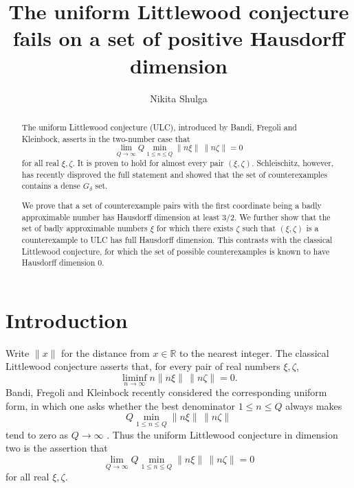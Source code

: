 \documentclass[11pt]{amsart}
\title[Uniform Littlewood counterexamples of positive dimension]{The uniform Littlewood conjecture fails on a set of positive Hausdorff dimension}
\author[Nikita Shulga]{Nikita Shulga}
\newcommand{\R}{\mathbb R}
\begin{document}
\begin{abstract}
The uniform Littlewood conjecture (ULC), introduced by Bandi,
Fregoli and Kleinbock, asserts in the two-number case that
$$
 \lim_{Q\to\infty} Q\min_{1\le n\le Q}\|n\xi\|\,\|n\zeta\|=0
$$
for all real $\xi,\zeta$.  It is proven to hold for almost every pair $(\xi,\zeta)$.
Schleischitz, however, has recently disproved the full statement and showed that the set of
counterexamples contains a dense $G_\delta$ set.

We prove that a set of counterexample pairs with the first coordinate being a badly approximable number has Hausdorff dimension at least $3/2$.  We further
show that the set of badly approximable numbers $\xi$ for which there exists
$\zeta$ such that $(\xi,\zeta)$ is a counterexample to ULC has full Hausdorff
dimension.  This contrasts with the classical Littlewood conjecture, for which
the set of possible counterexamples is known to have Hausdorff dimension $0$.
\end{abstract}

\maketitle



\bigskip

\section{Introduction}

Write $\|x\|$ for the distance from $x\in\R$ to the nearest integer.  The
classical Littlewood conjecture asserts that, for every pair of real numbers
$\xi,\zeta$,
$$
 \liminf_{n\to\infty} n\|n\xi\|\,\|n\zeta\|=0.
$$
Bandi, Fregoli and Kleinbock recently considered the corresponding uniform
form, in which one asks whether the best denominator $1\le n\le Q$ always makes
$$
 Q\min_{1\le n\le Q}\|n\xi\|\,\|n\zeta\|
$$
tend to zero as $Q\to\infty$ \cite{BandiFregoliKleinbock}.  Thus the
uniform Littlewood conjecture in dimension two is the assertion that
\begin{equation}\label{eq:ULCzero}
 \lim_{Q\to\infty} Q\min_{1\le n\le Q}\|n\xi\|\,\|n\zeta\|=0
\end{equation}
for all real $\xi,\zeta$.
\end{document}
